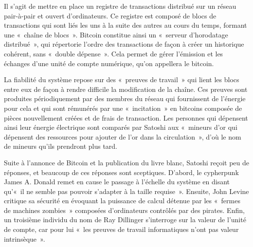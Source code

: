 

Il s'agit de mettre en place un registre de transactions distribué sur un réseau pair-à-pair et ouvert d'ordinateurs. Ce registre est composé de blocs de transactions qui sont liés les uns à la suite des autres au cours du temps, formant une «~chaîne de blocs~». Bitcoin constitue ainsi un «~serveur d'horodatage distribué~», qui répertorie l'ordre des transactions de façon à créer un historique cohérent, sans «~double dépense~». Cela permet de gérer l'émission et les échanges d'une unité de compte numérique, qu'on appellera le bitcoin.

La fiabilité du système repose sur des «~preuves de travail~» qui lient les blocs entre eux de façon à rendre difficile la modification de la chaîne. Ces preuves sont produites périodiquement par des membres du réseau qui fournissent de l'énergie pour cela et qui sont rémunérés par une «~incitation~» en bitcoins composée de pièces nouvellement créées et de frais de transaction. Les personnes qui dépensent ainsi leur énergie électrique sont comparés par Satoshi aux «~mineurs d'or qui dépensent des ressources pour ajouter de l'or dans la circulation~», d'où le nom de mineurs qu'ils prendront plus tard.


Suite à l'annonce de Bitcoin et la publication du livre blanc, Satoshi reçoit peu de réponses, et beaucoup de ces réponses sont sceptiques. D'abord, le cypherpunk James A. Donald remet en cause le passage à l'échelle du système en disant qu'«~il ne semble pas pouvoir s'adapter à la taille requise~». Ensuite, John Levine critique sa sécurité en évoquant la puissance de calcul détenue par les «~fermes de machines zombies~» composées d'ordinateurs contrôlés par des pirates. Enfin, un troisième individu du nom de Ray Dillinger s'interroge sur la valeur de l'unité de compte, car pour lui «~les preuves de travail informatiques n'ont pas valeur intrinsèque~».

